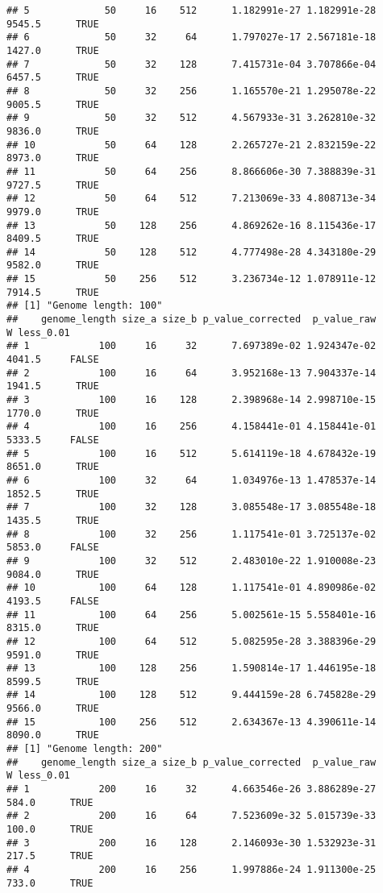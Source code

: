 \documentclass[]{book}
\begin{document}
\begin{verbatim}
## 5             50     16    512      1.182991e-27 1.182991e-28 9545.5      TRUE
## 6             50     32     64      1.797027e-17 2.567181e-18 1427.0      TRUE
## 7             50     32    128      7.415731e-04 3.707866e-04 6457.5      TRUE
## 8             50     32    256      1.165570e-21 1.295078e-22 9005.5      TRUE
## 9             50     32    512      4.567933e-31 3.262810e-32 9836.0      TRUE
## 10            50     64    128      2.265727e-21 2.832159e-22 8973.0      TRUE
## 11            50     64    256      8.866606e-30 7.388839e-31 9727.5      TRUE
## 12            50     64    512      7.213069e-33 4.808713e-34 9979.0      TRUE
## 13            50    128    256      4.869262e-16 8.115436e-17 8409.5      TRUE
## 14            50    128    512      4.777498e-28 4.343180e-29 9582.0      TRUE
## 15            50    256    512      3.236734e-12 1.078911e-12 7914.5      TRUE
## [1] "Genome length: 100"
##    genome_length size_a size_b p_value_corrected  p_value_raw      W less_0.01
## 1            100     16     32      7.697389e-02 1.924347e-02 4041.5     FALSE
## 2            100     16     64      3.952168e-13 7.904337e-14 1941.5      TRUE
## 3            100     16    128      2.398968e-14 2.998710e-15 1770.0      TRUE
## 4            100     16    256      4.158441e-01 4.158441e-01 5333.5     FALSE
## 5            100     16    512      5.614119e-18 4.678432e-19 8651.0      TRUE
## 6            100     32     64      1.034976e-13 1.478537e-14 1852.5      TRUE
## 7            100     32    128      3.085548e-17 3.085548e-18 1435.5      TRUE
## 8            100     32    256      1.117541e-01 3.725137e-02 5853.0     FALSE
## 9            100     32    512      2.483010e-22 1.910008e-23 9084.0      TRUE
## 10           100     64    128      1.117541e-01 4.890986e-02 4193.5     FALSE
## 11           100     64    256      5.002561e-15 5.558401e-16 8315.0      TRUE
## 12           100     64    512      5.082595e-28 3.388396e-29 9591.0      TRUE
## 13           100    128    256      1.590814e-17 1.446195e-18 8599.5      TRUE
## 14           100    128    512      9.444159e-28 6.745828e-29 9566.0      TRUE
## 15           100    256    512      2.634367e-13 4.390611e-14 8090.0      TRUE
## [1] "Genome length: 200"
##    genome_length size_a size_b p_value_corrected  p_value_raw      W less_0.01
## 1            200     16     32      4.663546e-26 3.886289e-27  584.0      TRUE
## 2            200     16     64      7.523609e-32 5.015739e-33  100.0      TRUE
## 3            200     16    128      2.146093e-30 1.532923e-31  217.5      TRUE
## 4            200     16    256      1.997886e-24 1.911300e-25  733.0      TRUE

\end{verbatim}
\end{document}
